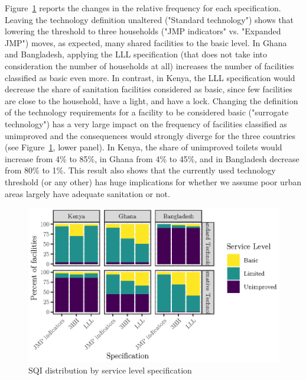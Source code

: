 \documentclass[natbib]{svjour3}                     %
\begin{document}
Figure~\ref{fig:freqlevels} reports the changes in the relative frequency for each specification. Leaving the technology definition unaltered ("Standard technology") shows that lowering the threshold to three households ("JMP indicators" vs. "Expanded JMP") moves, as expected,  many shared facilities to the basic level. In Ghana and Bangladesh, applying the LLL specification (that does not take into consideration the number of households at all) increases the number of facilities classified as basic even more. In contrast, in Kenya, the LLL specification would decrease the share of sanitation facilities considered as basic, since few facilities are close to the household, have a light, and have a lock. Changing the definition of the technology requirements for a facility to be considered basic ("surrogate technology") has a very large impact on the frequency of facilities classified as unimproved and the consequences would strongly diverge for the three countries (see Figure~\ref{fig:freqlevels}, lower panel). In Kenya, the share of unimproved toilets would increase from 4\% to 85\%, in Ghana from 4\% to 45\%, and in Bangladesh decrease from 80\% to 1\%. This result also shows that the currently used technology threshold (or any other) has huge implications for whether we assume poor urban areas largely have adequate sanitation or not. 

\begin{figure}[ht]
    \centering
    \includegraphics[width=0.99\linewidth]{figures/freqlevels.eps}
    \caption{SQI distribution by service level specification}
    \label{fig:freqlevels}
\end{figure}

\FloatBarrier

\end{document}

